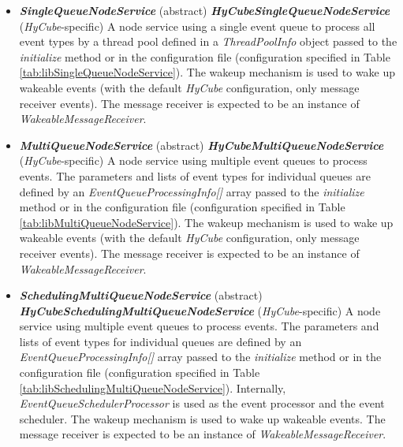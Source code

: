 \begin{itemize}
	\renewcommand{\labelitemi}{$\bullet$}
	
	\item \textbf{\emph{SingleQueueNodeService}} (abstract) \newline \textbf{\emph{HyCubeSingleQueueNodeService}} (\emph{HyCube}-specific) \newline A node service using a single event queue to process all event types by a thread pool defined in a \emph{ThreadPoolInfo} object passed to the \emph{initialize} method or in the configuration file (configuration specified in Table \ref{tab:libSingleQueueNodeService}). The wakeup mechanism is used to wake up wakeable events (with the default \emph{HyCube} configuration, only message receiver events). The message receiver is expected to be an instance of \emph{WakeableMessageReceiver}.
	
	\item \textbf{\emph{MultiQueueNodeService}} (abstract) \newline \textbf{\emph{HyCubeMultiQueueNodeService}} (\emph{HyCube}-specific) \newline A node service using multiple event queues to process events. The parameters and lists of event types for individual queues are defined by an \emph{EventQueueProcessingInfo[]} array passed to the \emph{initialize} method or in the configuration file (configuration specified in Table \ref{tab:libMultiQueueNodeService}). The wakeup mechanism is used to wake up wakeable events (with the default \emph{HyCube} configuration, only message receiver events). The message receiver is expected to be an instance of \emph{WakeableMessageReceiver}.
	
	\item \textbf{\emph{SchedulingMultiQueueNodeService}} (abstract) \newline \textbf{\emph{HyCubeSchedulingMultiQueueNodeService}} (\emph{HyCube}-specific) \newline A node service using multiple event queues to process events. The parameters and lists of event types for individual queues are defined by an \emph{EventQueueProcessingInfo[]} array passed to the \emph{initialize} method or in the configuration file (configuration specified in Table \ref{tab:libSchedulingMultiQueueNodeService}). Internally, \emph{EventQueueSchedulerProcessor} is used as the event processor and the event scheduler. The wakeup mechanism is used to wake up wakeable events. The message receiver is expected to be an instance of \emph{WakeableMessageReceiver}.
	

\end{itemize}
